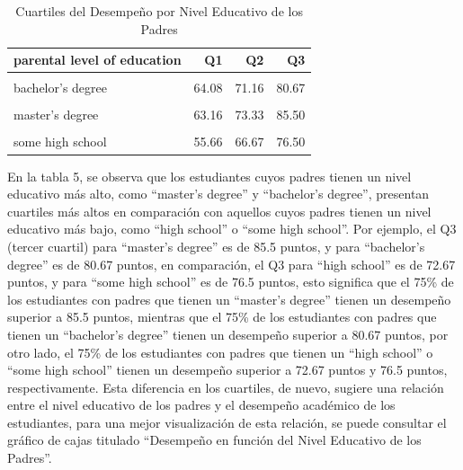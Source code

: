 \documentclass[
]{article}
\begin{document}
\begin{longtable}[t]{lrrr}
\caption{\label{tab:cuartiles}Cuartiles del Desempeño por Nivel Educativo de los Padres}\\
\toprule
parental level of education & Q1 & Q2 & Q3\\
\midrule
\cellcolor{gray!10}{associate's degree} & \cellcolor{gray!10}{58.67} & \cellcolor{gray!10}{69.67} & \cellcolor{gray!10}{79.00}\\
bachelor's degree & 64.08 & 71.16 & 80.67\\
\cellcolor{gray!10}{high school} & \cellcolor{gray!10}{53.92} & \cellcolor{gray!10}{65.00} & \cellcolor{gray!10}{72.67}\\
master's degree & 63.16 & 73.33 & 85.50\\
\cellcolor{gray!10}{some college} & \cellcolor{gray!10}{60.00} & \cellcolor{gray!10}{68.67} & \cellcolor{gray!10}{78.00}\\
\addlinespace
some high school & 55.66 & 66.67 & 76.50\\
\bottomrule
\end{longtable}

En la tabla 5, se observa que los estudiantes cuyos padres tienen un
nivel educativo más alto, como ``master's degree'' y ``bachelor's
degree'', presentan cuartiles más altos en comparación con aquellos
cuyos padres tienen un nivel educativo más bajo, como ``high school'' o
``some high school''. Por ejemplo, el Q3 (tercer cuartil) para
``master's degree'' es de 85.5 puntos, y para ``bachelor's degree'' es
de 80.67 puntos, en comparación, el Q3 para ``high school'' es de 72.67
puntos, y para ``some high school'' es de 76.5 puntos, esto significa
que el 75\% de los estudiantes con padres que tienen un ``master's
degree'' tienen un desempeño superior a 85.5 puntos, mientras que el
75\% de los estudiantes con padres que tienen un ``bachelor's degree''
tienen un desempeño superior a 80.67 puntos, por otro lado, el 75\% de
los estudiantes con padres que tienen un ``high school'' o ``some high
school'' tienen un desempeño superior a 72.67 puntos y 76.5 puntos,
respectivamente. Esta diferencia en los cuartiles, de nuevo, sugiere una
relación entre el nivel educativo de los padres y el desempeño académico
de los estudiantes, para una mejor visualización de esta relación, se
puede consultar el gráfico de cajas titulado ``Desempeño en función del
Nivel Educativo de los Padres''.
\end{document}
